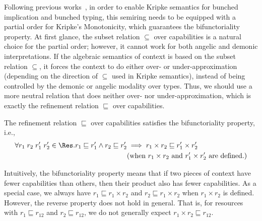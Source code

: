 Following previous works~\cite{BunchedType, ...}, in order to enable Kripke semantics for bunched implication and bunched typing, this semiring needs to be equipped with a partial order for Kripke's Monotonicity, which guarantees the bifunctoriality property. At first glance, the subset relation $\subseteq$ over capabilities is a natural choice for the partial order; however, it cannot work for both angelic and demonic interpretations. If the algebraic semantics of context is based on the subset relation $\subseteq$, it forces the context to do either over- or under-approximation (depending on the direction of $\subseteq$ used in Kripke semantics), instead of being controlled by the demonic or angelic modality over types. Thus, we should use a more neutral relation that does neither over- nor under-approximation, which is exactly the refinement relation $\sqsubseteq$ over capabilities.

\begin{definition}[Bifunctoriality]\label{def:bifunctoriality}
  The refinement relation $\sqsubseteq$ over capabilities satisfies the bifunctoriality property, i.e.,
  \begin{align*}
    \forall r_1\;r_2\;r_1'\;r_2' \in \Res. r_1 \sqsubseteq r_1' \land r_2 \sqsubseteq r_2' &\implies r_1 \times r_2 \sqsubseteq r_1' \times r_2' 
    \\& (\text{when } r_1 \times r_2 \text{ and } r_1' \times r_2' \text{ are defined.})
  \end{align*}
\end{definition}

Intuitively, the bifunctoriality property means that if two pieces of context have fewer capabilities than others, then their product also has fewer capabilities. As a special case, we always have $r_1 \sqsubseteq r_1 \times r_2$ and $r_2 \sqsubseteq r_1 \times r_2$ when $r_1 \times r_2$ is defined. However, the reverse property does not hold in general. That is, for resources with $r_1 \sqsubseteq r_{12}$ and $r_2 \sqsubseteq r_{12}$, we do not generally expect $r_1 \times r_2 \sqsubseteq r_{12}$.

